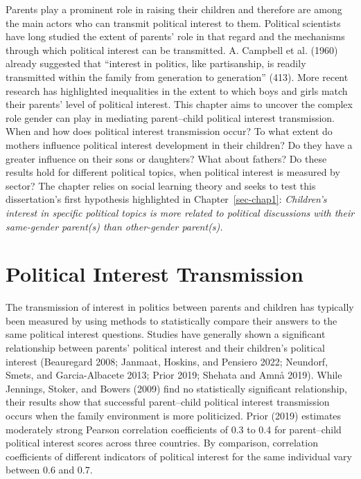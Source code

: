 \documentclass[
  letterpaper,
  DIV=11,
  numbers=noendperiod]{scrreprt}
\begin{document}
Parents play a prominent role in raising their children and therefore
are among the main actors who can transmit political interest to them.
Political scientists have long studied the extent of parents' role in
that regard and the mechanisms through which political interest can be
transmitted. A. Campbell et al. (1960) already suggested that ``interest
in politics, like partisanship, is readily transmitted within the family
from generation to generation'' (413). More recent research has
highlighted inequalities in the extent to which boys and girls match
their parents' level of political interest. This chapter aims to uncover
the complex role gender can play in mediating parent--child political
interest transmission. When and how does political interest transmission
occur? To what extent do mothers influence political interest
development in their children? Do they have a greater influence on their
sons or daughters? What about fathers? Do these results hold for
different political topics, when political interest is measured by
sector? The chapter relies on social learning theory and seeks to test
this dissertation's first hypothesis highlighted in
Chapter~\ref{sec-chap1}: \emph{Children's interest in specific political
topics is more related to political discussions with their same-gender
parent(s) than other-gender parent(s).}

\hypertarget{political-interest-transmission}{%
\section{Political Interest
Transmission}\label{political-interest-transmission}}

The transmission of interest in politics between parents and children
has typically been measured by using methods to statistically compare
their answers to the same political interest questions. Studies have
generally shown a significant relationship between parents' political
interest and their children's political interest (Beauregard 2008;
Janmaat, Hoskins, and Pensiero 2022; Neundorf, Smets, and
Garcia-Albacete 2013; Prior 2019; Shehata and Amnå 2019). While
Jennings, Stoker, and Bowers (2009) find no statistically significant
relationship, their results show that successful parent--child political
interest transmission occurs when the family environment is more
politicized. Prior (2019) estimates moderately strong Pearson
correlation coefficients of 0.3 to 0.4 for parent--child political
interest scores across three countries. By comparison, correlation
coefficients of different indicators of political interest for the same
individual vary between 0.6 and 0.7.
\end{document}
